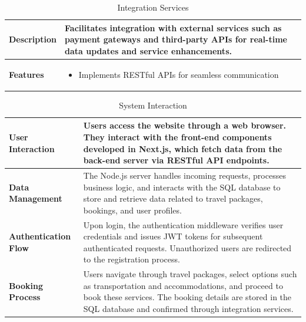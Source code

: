 \documentclass{scrreprt}
\begin{document}
    \vspace{0.5cm}
    
    \begin{table}[ht]
    \centering
    \caption{Integration Services}
    \begin{tabular}{|p{4cm}|p{10cm}|}
    \hline
    \textbf{Description} & Facilitates integration with external services such as payment gateways and third-party APIs for real-time data updates and service enhancements. \\
    \hline
    \textbf{Features} &
    \begin{itemize}[label=$\bullet$]
      \item Implements RESTful APIs for seamless communication
    \end{itemize} \\
    \hline
    \end{tabular}
    \end{table}
    
    \begin{table}[ht]
    \centering
    \caption{System Interaction}
    \begin{tabular}{|p{4cm}|p{10cm}|}
    \hline
    \textbf{User Interaction} & Users access the website through a web browser. They interact with the front-end components developed in Next.js, which fetch data from the back-end server via RESTful API endpoints. \\
    \hline
    \textbf{Data Management} & The Node.js server handles incoming requests, processes business logic, and interacts with the SQL database to store and retrieve data related to travel packages, bookings, and user profiles. \\
    \hline
    \textbf{Authentication Flow} & Upon login, the authentication middleware verifies user credentials and issues JWT tokens for subsequent authenticated requests. Unauthorized users are redirected to the registration process. \\
    \hline
    \textbf{Booking Process} & Users navigate through travel packages, select options such as transportation and accommodations, and proceed to book these services. The booking details are stored in the SQL database and confirmed through integration services. \\
    \hline
    \end{tabular}
    \end{table}
    
    \vspace{0.5cm}
    
\end{document}
